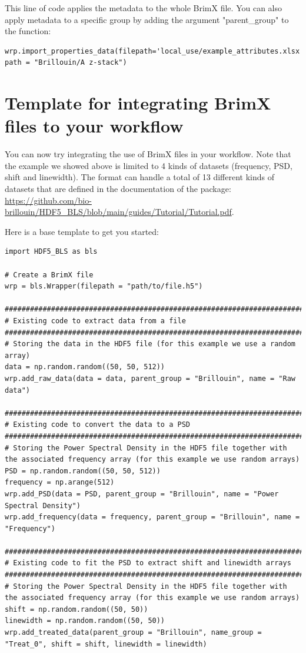 \documentclass{article}
\begin{document}
This line of code applies the metadata to the whole BrimX file. You can also apply metadata to a specific group by adding the argument "parent\_group" to the function:

\begin{lstlisting}
wrp.import_properties_data(filepath='local_use/example_attributes.xlsx', path = "Brillouin/A z-stack")
\end{lstlisting}


\section{Template for integrating BrimX files to your workflow}

You can now try integrating the use of BrimX files in your workflow. Note that the example we showed above is limited to 4 kinds of datasets (frequency, PSD, shift and linewidth). The format can handle a total of 13 different kinds of datasets that are defined in the documentation of the package: \url{https://github.com/bio-brillouin/HDF5_BLS/blob/main/guides/Tutorial/Tutorial.pdf}.

Here is a base template to get you started:

\begin{lstlisting}
import HDF5_BLS as bls

# Create a BrimX file
wrp = bls.Wrapper(filepath = "path/to/file.h5")

###############################################################################
# Existing code to extract data from a file
###############################################################################
# Storing the data in the HDF5 file (for this example we use a random array)
data = np.random.random((50, 50, 512))
wrp.add_raw_data(data = data, parent_group = "Brillouin", name = "Raw data")

###############################################################################
# Existing code to convert the data to a PSD
###############################################################################
# Storing the Power Spectral Density in the HDF5 file together with the associated frequency array (for this example we use random arrays)
PSD = np.random.random((50, 50, 512))
frequency = np.arange(512)
wrp.add_PSD(data = PSD, parent_group = "Brillouin", name = "Power Spectral Density")
wrp.add_frequency(data = frequency, parent_group = "Brillouin", name = "Frequency")

###############################################################################
# Existing code to fit the PSD to extract shift and linewidth arrays
###############################################################################
# Storing the Power Spectral Density in the HDF5 file together with the associated frequency array (for this example we use random arrays)
shift = np.random.random((50, 50))
linewidth = np.random.random((50, 50))
wrp.add_treated_data(parent_group = "Brillouin", name_group = "Treat_0", shift = shift, linewidth = linewidth)
\end{lstlisting}
\end{document}
